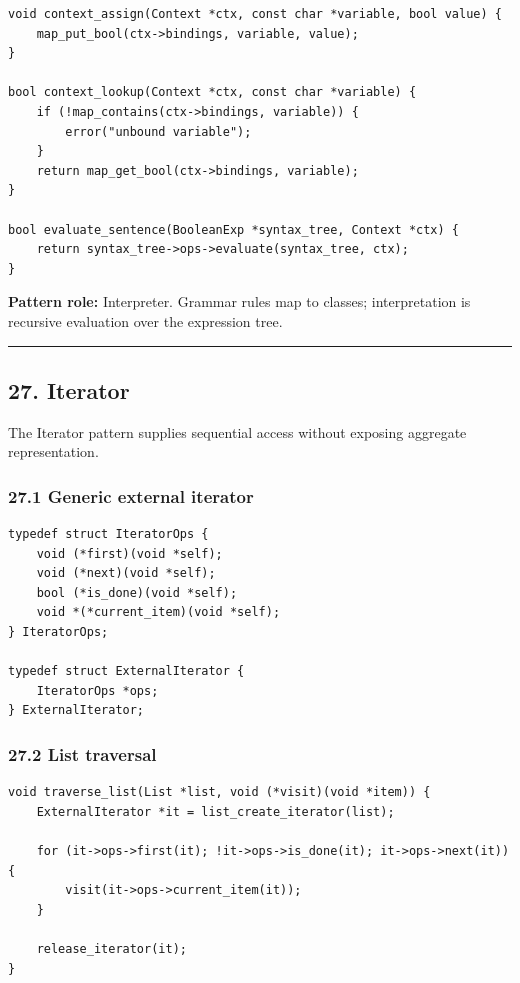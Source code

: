 \documentclass[11pt]{article}
\begin{document}
\begin{verbatim}
void context_assign(Context *ctx, const char *variable, bool value) {
    map_put_bool(ctx->bindings, variable, value);
}

bool context_lookup(Context *ctx, const char *variable) {
    if (!map_contains(ctx->bindings, variable)) {
        error("unbound variable");
    }
    return map_get_bool(ctx->bindings, variable);
}

bool evaluate_sentence(BooleanExp *syntax_tree, Context *ctx) {
    return syntax_tree->ops->evaluate(syntax_tree, ctx);
}
\end{verbatim}

\textbf{Pattern role:} Interpreter. Grammar rules map to classes; interpretation is recursive evaluation over the expression tree.

\begin{center}\rule{0.5\linewidth}{0.5pt}\end{center}

\subsection{27. Iterator}\label{iterator}

The Iterator pattern supplies sequential access without exposing aggregate representation.

\subsubsection{27.1 Generic external iterator}\label{generic-external-iterator}

\begin{verbatim}
typedef struct IteratorOps {
    void (*first)(void *self);
    void (*next)(void *self);
    bool (*is_done)(void *self);
    void *(*current_item)(void *self);
} IteratorOps;

typedef struct ExternalIterator {
    IteratorOps *ops;
} ExternalIterator;
\end{verbatim}

\subsubsection{27.2 List traversal}\label{list-traversal}

\begin{verbatim}
void traverse_list(List *list, void (*visit)(void *item)) {
    ExternalIterator *it = list_create_iterator(list);

    for (it->ops->first(it); !it->ops->is_done(it); it->ops->next(it)) {
        visit(it->ops->current_item(it));
    }

    release_iterator(it);
}
\end{verbatim}
\end{document}
